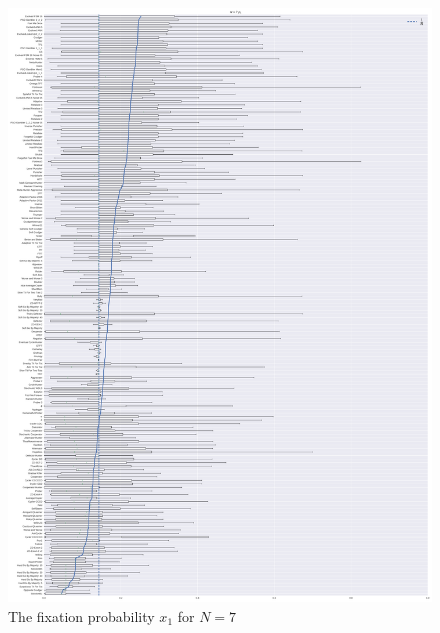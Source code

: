 \documentclass{article}
\begin{document}
\begin{figure}[!hbtp]
    \centering
    \includegraphics[height=.8\textheight]{./img/boxplot_7_invade.pdf}
    \caption{The fixation probability \(x_1\) for \(N=7\)}
    \label{fig:boxplot_7_invade}
\end{figure}
\end{document}
